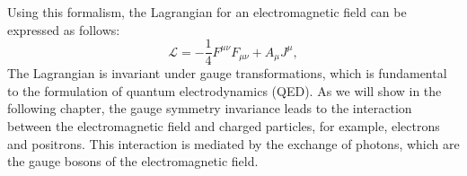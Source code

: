             Using this formalism, the Lagrangian for an electromagnetic field can be expressed as follows:
            \begin{equation}
                \mathcal{L} = -\frac{1}{4}F^{\mu\nu}F_{\mu\nu} + A_{\mu}J^{\mu},
            \end{equation}
            The Lagrangian is invariant under gauge transformations, which is fundamental to the formulation 
            of quantum electrodynamics (QED). As we will show in the following chapter, the gauge symmetry 
            invariance leads to the interaction between the electromagnetic field and charged particles, for example, electrons 
            and positrons. This interaction is mediated by the exchange of photons, which are the gauge bosons
            of the electromagnetic field. 

